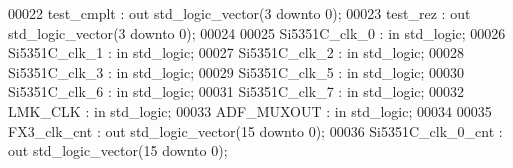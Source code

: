 \begin{DoxyCode}
00022           \textcolor{vhdlchar}{test_cmplt}            \textcolor{vhdlchar}{:} \textcolor{keywordflow}{out} \textcolor{comment}{std\_logic\_vector}\textcolor{vhdlchar}{(}\textcolor{vhdllogic}{}\textcolor{vhdllogic}{3} \textcolor{keywordflow}{downto} \textcolor{vhdllogic}{}\textcolor{vhdllogic}{0}\textcolor{vhdlchar}{)};
00023           \textcolor{vhdlchar}{test_rez}              \textcolor{vhdlchar}{:} \textcolor{keywordflow}{out} \textcolor{comment}{std\_logic\_vector}\textcolor{vhdlchar}{(}\textcolor{vhdllogic}{}\textcolor{vhdllogic}{3} \textcolor{keywordflow}{downto} \textcolor{vhdllogic}{}\textcolor{vhdllogic}{0}\textcolor{vhdlchar}{)};
00024           
00025           \textcolor{vhdlchar}{Si5351C_clk_0}         \textcolor{vhdlchar}{:} \textcolor{keywordflow}{in} \textcolor{comment}{std\_logic};
00026           \textcolor{vhdlchar}{Si5351C_clk_1}         \textcolor{vhdlchar}{:} \textcolor{keywordflow}{in} \textcolor{comment}{std\_logic};
00027           \textcolor{vhdlchar}{Si5351C_clk_2}         \textcolor{vhdlchar}{:} \textcolor{keywordflow}{in} \textcolor{comment}{std\_logic};
00028           \textcolor{vhdlchar}{Si5351C_clk_3}         \textcolor{vhdlchar}{:} \textcolor{keywordflow}{in} \textcolor{comment}{std\_logic};
00029           \textcolor{vhdlchar}{Si5351C_clk_5}         \textcolor{vhdlchar}{:} \textcolor{keywordflow}{in} \textcolor{comment}{std\_logic};
00030           \textcolor{vhdlchar}{Si5351C_clk_6}         \textcolor{vhdlchar}{:} \textcolor{keywordflow}{in} \textcolor{comment}{std\_logic};
00031           \textcolor{vhdlchar}{Si5351C_clk_7}         \textcolor{vhdlchar}{:} \textcolor{keywordflow}{in} \textcolor{comment}{std\_logic};
00032           \textcolor{vhdlchar}{LMK_CLK}               \textcolor{vhdlchar}{:} \textcolor{keywordflow}{in} \textcolor{comment}{std\_logic};
00033           \textcolor{vhdlchar}{ADF_MUXOUT}            \textcolor{vhdlchar}{:} \textcolor{keywordflow}{in} \textcolor{comment}{std\_logic};
00034           
00035           \textcolor{vhdlchar}{FX3_clk_cnt}           \textcolor{vhdlchar}{:} \textcolor{keywordflow}{out} \textcolor{comment}{std\_logic\_vector}\textcolor{vhdlchar}{(}\textcolor{vhdllogic}{}\textcolor{vhdllogic}{15} \textcolor{keywordflow}{downto} \textcolor{vhdllogic}{}\textcolor{vhdllogic}{0}\textcolor{vhdlchar}{)};
00036           \textcolor{vhdlchar}{Si5351C_clk_0_cnt}     \textcolor{vhdlchar}{:} \textcolor{keywordflow}{out} \textcolor{comment}{std\_logic\_vector}\textcolor{vhdlchar}{(}\textcolor{vhdllogic}{}\textcolor{vhdllogic}{15} \textcolor{keywordflow}{downto} \textcolor{vhdllogic}{}\textcolor{vhdllogic}{0}\textcolor{vhdlchar}{)};

\end{DoxyCode}
